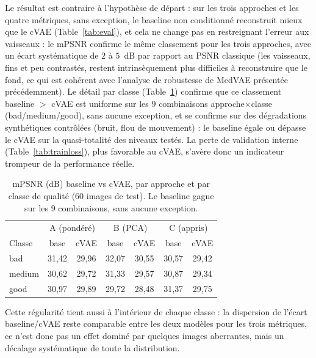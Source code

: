 \documentclass[conference]{IEEEtran}
\begin{document}
Le résultat est contraire à l'hypothèse de départ : sur les trois approches
et les quatre métriques, sans exception, le baseline non conditionné
reconstruit mieux que le cVAE (Table~\ref{tab:eval}), et cela
ne change pas en restreignant l'erreur aux vaisseaux : le mPSNR confirme le
même classement pour les trois approches, avec un écart systématique de
$2$ à $5$~dB par rapport au PSNR classique (les vaisseaux, fins et peu
contrastés, restent intrinsèquement plus difficiles à reconstruire que le
fond,
ce qui est cohérent avec l'analyse de robustesse de MedVAE présentée
précédemment). Le détail par classe (Table~\ref{tab:mpsnr-class}) confirme
que ce classement baseline $>$ cVAE est uniforme sur les 9 combinaisons
approche$\times$classe (bad/medium/good), sans aucune exception, et se
confirme sur des dégradations synthétiques contrôlées (bruit, flou de
mouvement) : le baseline égale ou dépasse le cVAE sur la quasi-totalité des
niveaux testés. La perte de validation interne (Table~\ref{tab:trainloss}),
plus favorable au cVAE, s'avère donc
un indicateur trompeur de la performance réelle.

\begin{table}[htbp]
  \centering
  \footnotesize
  \begin{tabular}{@{}lcccccc@{}}
    \toprule
    & \multicolumn{2}{c}{A (pondéré)} & \multicolumn{2}{c}{B (PCA)} & \multicolumn{2}{c}{C (appris)} \\
    Classe & base & cVAE & base & cVAE & base & cVAE \\
    \midrule
    bad    & 31{,}42 & 29{,}96 & 32{,}07 & 30{,}55 & 30{,}57 & 29{,}42 \\
    medium & 30{,}62 & 29{,}72 & 31{,}33 & 29{,}57 & 30{,}87 & 29{,}34 \\
    good   & 30{,}97 & 29{,}89 & 29{,}72 & 28{,}48 & 31{,}37 & 29{,}75 \\
    \bottomrule
  \end{tabular}
  \caption{mPSNR (dB) baseline vs cVAE, par approche et par classe de
  qualité (60 images de test). Le baseline gagne sur les 9 combinaisons,
  sans aucune exception.}
  \label{tab:mpsnr-class}
\end{table}

Cette régularité tient aussi à l'intérieur de chaque classe : la
dispersion de l'écart baseline/cVAE reste comparable entre les deux
modèles pour les trois métriques, ce n'est donc pas un effet dominé par
quelques images aberrantes, mais un décalage systématique de toute la
distribution.
\end{document}
